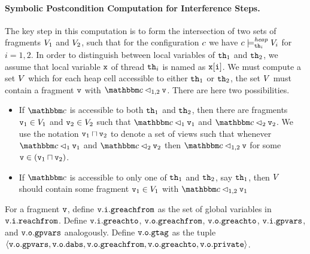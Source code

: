 \paragraph{Symbolic Postcondition Computation for Interference Steps.} 
The key step in this computation is
to form the intersection of two sets of fragments
$V_1$ and $V_2$, such that for the configuration $c$
we have $c \models_{{\tt th}_i}^{\mathit{heap}} V_i$ for $i=1,2$.
In order to distinguish
between local variables of ${\tt th}_1$ and ${\tt th}_2$, we assume that local variable $\mathtt{x}$ of thread ${\tt th}_i$ is named as $\mathtt{x[i]}$.
We must compute a set $V$ which for each
heap cell accessible to either ${\tt th}_1$ or ${\tt th}_2$, the set $V$ must
contain a fragment $\mathtt{v}$ with $\cell \satfrag{1,2} \frag$.
There are  here two possibilities.
\begin{itemize}
\item If $\cell$ is accessible to both ${\tt th}_1$ and ${\tt th}_2$, then
  there are fragments $\mathtt{v}_1 \in V_1$ and $\mathtt{v}_2 \in V_2$
  such that $\cell \satfrag{1} \frag_1$ and $\cell \satfrag{2} \frag_2$.
  We use the notation $\mathtt{v}_1 \sqcap \mathtt{v}_2$ to denote a set of views such that
  whenever $\cell \satfrag{1} \frag_1$ and $\cell \satfrag{2} \frag_2$ then
  $\cell \satfrag{1,2} \frag$ for some $\mathtt{v} \in (\mathtt{v}_1 \sqcap \mathtt{v}_2)$.
\item If $\cell$ is accessible to only one of ${\tt th}_1$ and ${\tt th}_2$,
  say ${\tt th}_1$, then $V$ should contain some fragment
  $\mathtt{v}_1 \in V_1$ with $\cell \satfrag{1,2} \frag_1$
\end{itemize}
For a fragment $\mathtt{v}$, define
$\mathtt{v}.\mathtt{i}.\mathtt{greachfrom}$ as the set of global variables in
$\mathtt{v}.\mathtt{i}.\mathtt{reachfrom}$. Define
$\mathtt{v}.\mathtt{i}.\mathtt{greachto}$,
$\mathtt{v}.\mathtt{o}.\mathtt{greachfrom}$,
$\mathtt{v}.\mathtt{o}.\mathtt{greachto}$,
$\mathtt{v}.\mathtt{i}.\mathtt{gpvars}$, and
$\mathtt{v}.\mathtt{o}.\mathtt{gpvars}$
analogously.
Define $\mathtt{v}.\mathtt{o}.\mathtt{gtag}$ as the tuple
$\left\langle\mathtt{v}.\mathtt{o}.\mathtt{gpvars},\mathtt{v}.\mathtt{o}.\mathtt{dabs},\mathtt{v}.\mathtt{o}.\mathtt{greachfrom},\mathtt{v}.\mathtt{o}.\mathtt{greachto},\mathtt{v}.\mathtt{o}.\mathtt{private}\right\rangle$.

 

